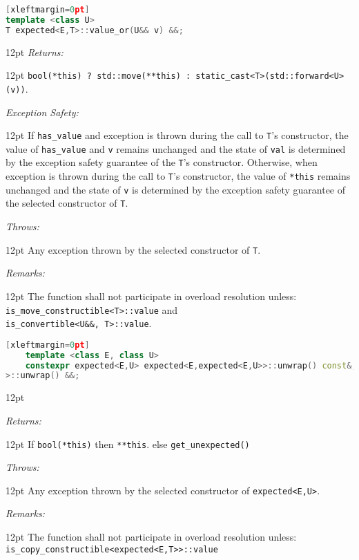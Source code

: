 \documentclass[a4paper,10pt]{article}
\newcommand{\cpp}[1]{\lstinline{#1}}
\newcommand{\wordingItem}[1]{\noindent\textit{#1:}}
\newenvironment{wordingTextItem}[1]{\wordingItem{#1}\vspace{2pt}\noindent\begin{adjustwidth}{12pt}{}}{\vspace{2pt}\end{adjustwidth}}
\newenvironment{wordingPara}{\begin{adjustwidth}{12pt}{}}{\end{adjustwidth}}
\begin{document}
\begin{lstlisting}[language=C++][xleftmargin=0pt]
template <class U>
T expected<E,T>::value_or(U&& v) &&; 
\end{lstlisting}
\begin{wordingPara}
\begin{wordingTextItem}{Returns}
\cpp{bool(*this) ? std::move(**this) : static_cast<T>(std::forward<U>(v))}.
\end{wordingTextItem}
\begin{wordingTextItem}{Exception Safety}
If \cpp{has_value} and exception is thrown during the call to \cpp{T}'s constructor, the value of \cpp{has_value} and \cpp{v} remains unchanged and the state of \cpp{val} is determined by the exception safety guarantee of the \cpp{T}'s constructor. Otherwise, when exception is thrown during the call to \cpp{T}'s constructor, the value of \cpp{*this} remains unchanged and the state of \cpp{v} is determined by the exception safety guarantee of the selected constructor of \cpp{T}.
\end{wordingTextItem}
\begin{wordingTextItem}{Throws}
Any exception thrown by the selected constructor of \cpp{T}.
\end{wordingTextItem}
\begin{wordingTextItem}{Remarks}
The function shall not participate in overload resolution unless: \\
\cpp{is_move_constructible<T>::value} and \\
\cpp{is_convertible<U&&, T>::value}.
\end{wordingTextItem}
\end{wordingPara}

\begin{lstlisting}[language=C++][xleftmargin=0pt]
    template <class E, class U>
    constexpr expected<E,U> expected<E,expected<E,U>>::unwrap() const&;
>::unwrap() &&;
\end{lstlisting}

\begin{wordingPara}

\begin{wordingTextItem}{Returns}
If \cpp{bool(*this)} then \cpp{**this}.
else \cpp{get_unexpected()}
\end{wordingTextItem}

\begin{wordingTextItem}{Throws}
Any exception thrown by the selected constructor of \cpp{expected<E,U>}.
\end{wordingTextItem}

\begin{wordingTextItem}{Remarks}
The function shall not participate in overload resolution unless: \\
\cpp{is_copy_constructible<expected<E,T>>::value} \\
\end{wordingTextItem}

\end{wordingPara}
\end{document}
